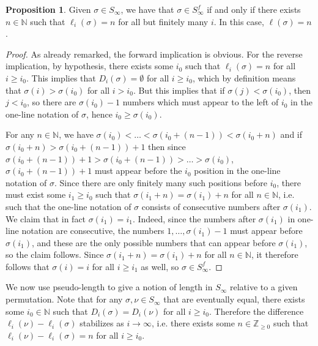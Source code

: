 \documentclass[oneside,11pt,reqno]{amsart}
\newcommand{\zz}{\ensuremath{\mathbb{Z}}}
\newcommand{\nn}{\ensuremath{\mathbb{N}}}
\theoremstyle{definition}
\newtheorem{proof techniques}{Proof Techniques}
\newtheorem{proposition}{Proposition}
\begin{document}
\begin{proposition}\label{prop: eventually constant ell implies in f}
    Given $\sigma \in S_\infty$, we have that $\sigma \in S_\infty^f$ if and only if there exists $n \in \nn$ such that $\ell_i(\sigma) = n$ for all but finitely many $i$. In this case, $\ell(\sigma) = n$. 
\end{proposition}

\begin{proof}
As already remarked, the forward implication is obvious. For the reverse implication, by hypothesis, there exists some $i_0$ such that $\ell_{i}(\sigma) = n$ for all $i \geq i_0$. This implies that $D_i(\sigma) = \emptyset$ for all $i \geq i_0$, which by definition means that $\sigma(i) > \sigma(i_0)$ for all $i > i_0$. But this implies that if $\sigma(j) < \sigma(i_0)$, then $j < i_0$, so there are $\sigma(i_0) - 1$ numbers which must appear to the left of $i_0$ in the one-line notation of $\sigma$, hence $i_0 \geq \sigma(i_0)$. 


For any $n \in \nn$, we have $\sigma(i_0) < \ldots < \sigma(i_0 + (n - 1)) < \sigma(i_0 + n)$ and if $\sigma(i_0 + n) > \sigma(i_0 + (n - 1)) + 1$ then since $\sigma(i_0 + (n - 1)) + 1 > \sigma(i_0 + (n - 1)) > \ldots > \sigma(i_0)$, $\sigma(i_0 + (n - 1)) + 1$ must appear before the $i_0$ position in the one-line notation of $\sigma$. Since there are only finitely many such positions before $i_0$, there must exist some $i_1 \geq i_0$ such that $\sigma(i_1 + n) = \sigma(i_1) + n$ for all $n \in \nn$, i.e. such that the one-line notation of $\sigma$ consists of consecutive numbers after $\sigma(i_1)$. We claim that in fact $\sigma(i_1) = i_1$. Indeed, since the numbers after $\sigma(i_1)$ in one-line notation are consecutive, the numbers $1 , \ldots, \sigma(i_1) - 1$ must appear before $\sigma(i_1)$, and these are the only possible numbers that can appear before $\sigma(i_1)$, so the claim follows. Since $\sigma(i_1 + n) = \sigma(i_1) + n$ for all $n \in \nn$, it therefore follows that $\sigma(i) = i$ for all $i \geq i_1$ as well, so $\sigma \in S_\infty^f$. 
\end{proof}


We now use pseudo-length to give a notion of length in $S_\infty$ relative to a given permutation. Note that for any $\sigma, \nu \in S_\infty$ that are eventually equal, there exists some $i_0 \in \nn$ such that $D_i(\sigma) = D_i(\nu)$ for all $i \geq i_0$. Therefore the difference $\ell_i(\nu) - \ell_i(\sigma)$ stabilizes as $i \to \infty$, i.e. there exists some $n \in \zz_{\geq 0}$ such that $\ell_i(\nu) - \ell_i(\sigma) = n$ for all $i \geq i_0$. 
\end{document}
